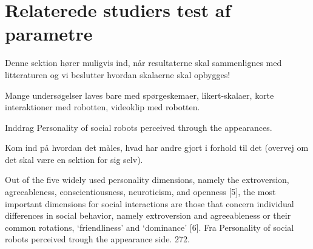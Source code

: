\section{Relaterede studiers test af parametre}
\label{ParametreTidligereStudier}
%
Denne sektion hører muligvis ind, når resultaterne skal sammenlignes med litteraturen og vi beslutter hvordan skalaerne skal opbygges!\blankline


Mange undersøgelser laves bare med spørgeskemaer, likert-skalaer, korte interaktioner med robotten, videoklip med robotten. 

\noindent Inddrag Personality of social robots perceived through the appearances.

\noindent Kom ind på hvordan det måles, hvad har andre gjort i forhold til det (overvej om det skal være en sektion for sig selv).\blankline


Out of the five widely used personality dimensions, namely the extroversion, agreeableness, conscientiousness, neuroticism, and openness [5], the most important dimensions for social interactions are those that concern individual differences in social behavior, namely extroversion and agreeableness or their common rotations, ‘friendliness’ and ‘dominance’ [6]. Fra Personality of social robots perceived trough the appearance side. 272.